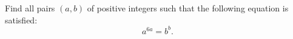 Find all pairs $(a,b)$ of positive integers such that the following equation is satisfied: 
$$a^{6a}=b^b.$$
